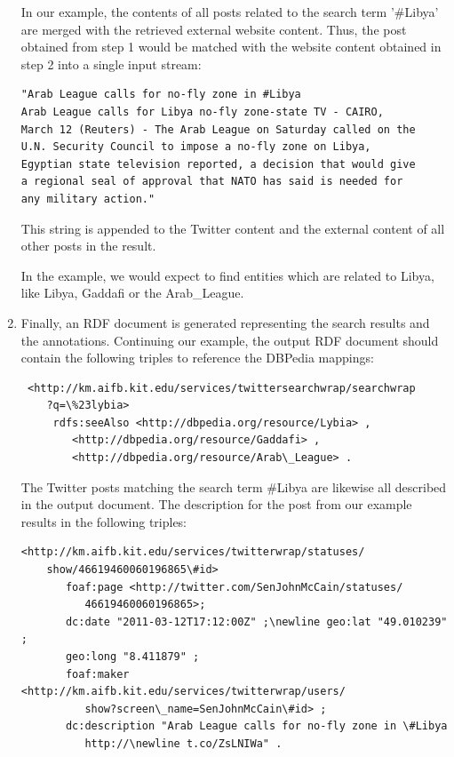 \documentclass{llncs}
\begin{document}
\begin{enumerate}
In our example, the contents of all posts related to the search term '\#Libya'
are merged with the retrieved external website content. Thus, the post obtained from
step 1 would be matched with the website content obtained in step 2 into a
single input stream:
\begin{verbatim}"Arab League calls for no-fly zone in #Libya
Arab League calls for Libya no-fly zone-state TV - CAIRO, 
March 12 (Reuters) - The Arab League on Saturday called on the 
U.N. Security Council to impose a no-fly zone on Libya, 
Egyptian state television reported, a decision that would give
a regional seal of approval that NATO has said is needed for 
any military action."
\end{verbatim}
This string is appended to the Twitter content and the external content of all other posts in the result.

In the example, we would expect to find entities which are related to Libya,
like Libya, Gaddafi or the Arab\_League.

	\item	Finally, an RDF document is generated representing the search results and
	the annotations. Continuing our example, the output RDF document should contain the following
	triples to reference the DBPedia mappings:
	{\small\begin{verbatim}	<http://km.aifb.kit.edu/services/twittersearchwrap/searchwrap
	?q=\%23lybia>
     rdfs:seeAlso <http://dbpedia.org/resource/Lybia> ,
        <http://dbpedia.org/resource/Gaddafi> ,
        <http://dbpedia.org/resource/Arab\_League> .\end{verbatim}}
	The Twitter posts matching the search term \#Libya are likewise all described
	in the output document. The description for the post from our example 
	results in the following triples:
	{\small\begin{verbatim}<http://km.aifb.kit.edu/services/twitterwrap/statuses/
	show/46619460060196865\#id> 
	   foaf:page <http://twitter.com/SenJohnMcCain/statuses/
	      46619460060196865>;
	   dc:date "2011-03-12T17:12:00Z" ;\newline geo:lat "49.010239" ;
	   geo:long "8.411879" ;
	   foaf:maker <http://km.aifb.kit.edu/services/twitterwrap/users/
	      show?screen\_name=SenJohnMcCain\#id> ;
	   dc:description "Arab League calls for no-fly zone in \#Libya 
	      http://\newline t.co/ZsLNIWa" . \end{verbatim}}     
\end{enumerate}
\end{document}
